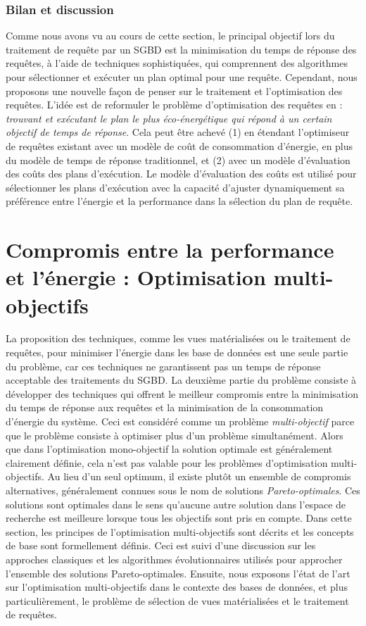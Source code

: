 \subsubsection{Bilan et discussion}
Comme nous avons vu au cours de cette section, le principal objectif lors du traitement de requête par un SGBD est la minimisation du temps de réponse des requêtes, à l'aide de techniques sophistiquées, qui comprennent des algorithmes pour sélectionner et exécuter un plan optimal pour une requête. Cependant, nous proposons une nouvelle façon de penser sur le traitement et l'optimisation des requêtes. L'idée est de reformuler le problème d'optimisation des requêtes en : \textit{trouvant et exécutant le plan le plus éco-énergétique qui répond à un certain objectif de temps de réponse}. Cela peut être achevé (1) en étendant l'optimiseur de requêtes existant avec un modèle de coût de consommation d'énergie, en plus du modèle de temps de réponse traditionnel, et (2) avec un modèle d'évaluation des coûts des plans d'exécution. Le modèle d'évaluation des coûts est utilisé pour sélectionner les plans d'exécution avec la capacité d'ajuster dynamiquement sa préférence entre l'énergie et la performance dans la sélection du plan de requête.

\section{Compromis entre la performance et l'énergie : Optimisation multi-objectifs}
La proposition des techniques, comme les vues matérialisées ou le traitement de requêtes, pour minimiser l'énergie dans les base de données est une seule partie du problème, car ces techniques ne garantissent pas un temps de réponse acceptable des traitements du SGBD. La deuxième partie du problème consiste à développer des techniques qui offrent le meilleur compromis entre la minimisation du temps de réponse aux requêtes et la minimisation de la consommation d'énergie du système. Ceci est considéré comme un problème \textit{multi-objectif} parce que le problème consiste à optimiser plus d'un problème simultanément.
Alors que dans l'optimisation mono-objectif la solution optimale est généralement clairement définie, cela n'est pas valable pour les problèmes d'optimisation multi-objectifs. Au lieu d'un seul optimum, il existe plutôt un ensemble de compromis alternatives, généralement connues sous le nom de solutions \textit{Pareto-optimales}. Ces solutions sont optimales dans le sens qu'aucune autre solution dans l'espace de recherche est meilleure lorsque tous les objectifs sont pris en compte.
Dans cette section, les principes de l'optimisation multi-objectifs sont décrits et les concepts de base sont formellement définis. Ceci est suivi d'une discussion sur les approches classiques et les algorithmes évolutionnaires utilisés pour approcher l'ensemble des solutions Pareto-optimales. Ensuite, nous exposons l'état de l'art sur l'optimisation multi-objectifs dans le contexte des bases de données, et plus particulièrement, le problème de sélection de vues matérialisées et le traitement de requêtes.


